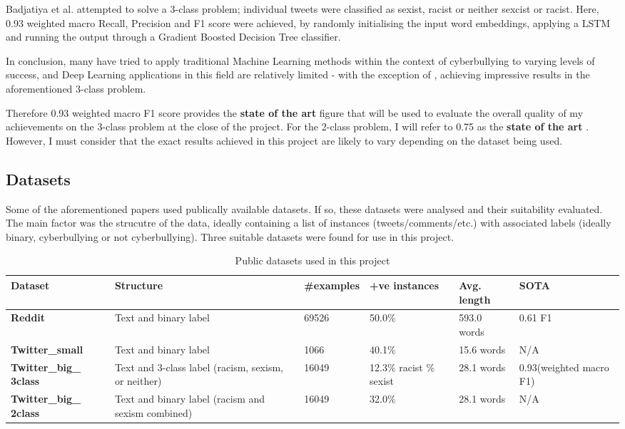 \documentclass[12pt,a4paper]{article}
\begin{document}
Badjatiya et al. \cite{Badjatiya} attempted to solve a 3-class problem; individual tweets were classified as sexist, racist or neither sexcist or racist. Here, 0.93 weighted macro Recall, Precision and F1 score were achieved, by randomly initialising the input word embeddings, applying a LSTM and running the output through a Gradient Boosted Decision Tree classifier. 

In conclusion, many have tried to apply traditional Machine Learning methods within the context of cyberbullying to varying levels of success, and Deep Learning applications in this field are relatively limited - with the exception of \cite{Badjatiya}, achieving impressive results in the aforementioned 3-class problem. 

Therefore 0.93 weighted macro F1 score provides the \textbf{state of the art} figure that will be used to evaluate the overall quality of my achievements on the 3-class problem at the close of the project. For the 2-class problem, I will refer to 0.75 as the \textbf{state of the art} \cite{Hack}. However, I must consider that the exact results achieved in this project are likely to vary depending on the dataset being used.


\subsection{Datasets}
Some of the aforementioned papers used publically available datasets. If so, these datasets were analysed and their suitability evaluated. The main factor was the strucutre of the data, ideally containing a list of instances (tweets/comments/etc.) with associated labels (ideally binary, cyberbullying or not cyberbullying). Three suitable datasets were found for use in this project.

\begin{table}[htb]
	\centering
	\caption{Public datasets used in this project}
	\label{data}
	\hspace*{-2.2cm}
	\begin{tabular}{p{3.4cm} p{5.2cm} p{2cm} p{2.5cm} p{2.2cm} p{2.2cm}} \hline\hline
		\textbf{Dataset} & \textbf{Structure} & \textbf{\#examples} & \textbf{+ve instances} & \textbf{Avg. length} & \textbf{SOTA} \\ \hline
		\textbf{Reddit} & Text and binary label & 69526 & 50.0\% & 593.0 words & 0.61 F1\\ \hline
		\textbf{Twitter\_small} & Text and binary label & 1066 & 40.1\% & 15.6 words & N/A \\ \hline
		\textbf{Twitter\_big\_ 3class} & Text and 3-class label \newline (racism, sexism, or neither) & 16049 & 12.3\% racist \newline 19.7\% sexist & 28.1 words & 0.93\newline (weighted macro F1) \\ \hline
		\textbf{Twitter\_big\_ 2class} & Text and binary label \newline (racism and sexism combined) & 16049 & 32.0\% & 28.1 words & N/A \\ \hline
	\end{tabular}
\end{table}
\end{document}
